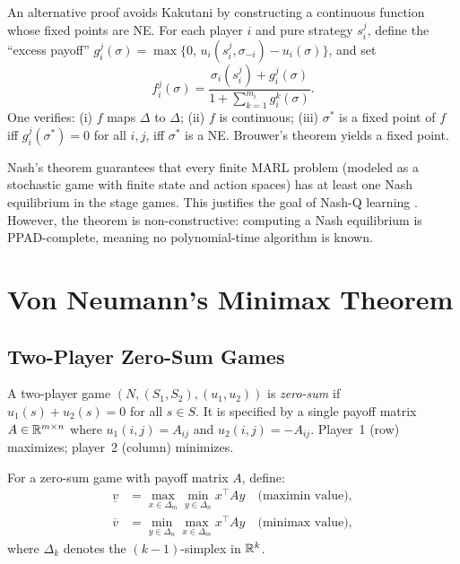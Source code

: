 \documentclass[11pt,a4paper]{article}
\begin{document}
\begin{remark}
\label{rem:brouwer_proof}
An alternative proof avoids Kakutani by constructing a continuous function
whose fixed points are NE. For each player $i$ and pure strategy $s_i^j$,
define the ``excess payoff''
$g_i^j(\sigma) = \max\{0,\, u_i(s_i^j, \sigma_{-i}) - u_i(\sigma)\}$,
and set
\[
    f_i^j(\sigma) = \frac{\sigma_i(s_i^j) + g_i^j(\sigma)}
    {1 + \sum_{k=1}^{m_i} g_i^k(\sigma)}.
\]
One verifies: (i) $f$ maps $\Delta$ to $\Delta$; (ii) $f$ is continuous;
(iii) $\sigma^*$ is a fixed point of $f$ iff $g_i^j(\sigma^*) = 0$ for all
$i, j$, iff $\sigma^*$ is a NE. Brouwer's theorem yields a fixed point.
\end{remark}

\begin{rlconnection}
Nash's theorem guarantees that every finite MARL problem (modeled as a
stochastic game with finite state and action spaces) has at least one Nash
equilibrium in the stage games. This justifies the goal of Nash-Q learning
\citep{shoham2008}. However, the theorem is non-constructive: computing a
Nash equilibrium is PPAD-complete, meaning no polynomial-time algorithm is
known.
\end{rlconnection}


\section{Von Neumann's Minimax Theorem}
\label{sec:minimax}

\subsection{Two-Player Zero-Sum Games}
\label{subsec:zero_sum}

\begin{definition}
\label{def:zero_sum}
A two-player game $(N, (S_1, S_2), (u_1, u_2))$ is \emph{zero-sum} if
$u_1(s) + u_2(s) = 0$ for all $s \in S$. It is specified by a single payoff
matrix $A \in \mathbb{R}^{m \times n}$ where $u_1(i,j) = A_{ij}$ and
$u_2(i,j) = -A_{ij}$. Player~1 (row) maximizes; player~2 (column) minimizes.
\end{definition}

\begin{definition}
\label{def:maximin}
For a zero-sum game with payoff matrix $A$, define:
\begin{align*}
    \underline{v} &= \max_{x \in \Delta_m} \min_{y \in \Delta_n}
    x^\top A y \quad \text{(maximin value)}, \\
    \overline{v} &= \min_{y \in \Delta_n} \max_{x \in \Delta_m}
    x^\top A y \quad \text{(minimax value)},
\end{align*}
where $\Delta_k$ denotes the $(k-1)$-simplex in $\mathbb{R}^k$.
\end{definition}
\end{document}
